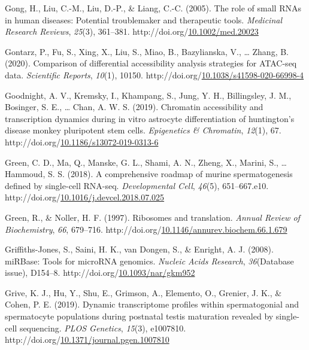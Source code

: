 \documentclass[12pt,twoside]{reedthesis}
\newlength{\cslhangindent}
\newenvironment{CSLReferences}[2] %
 {%
  \setlength{\parindent}{0pt}
  \ifodd #1 \everypar{\setlength{\hangindent}{\cslhangindent}}\ignorespaces\fi
  \ifnum #2 > 0
  \setlength{\parskip}{#2\baselineskip}
  \fi
 }%
 {}
\begin{document}
\begin{CSLReferences}{1}{0}
\leavevmode{}%
Gong, H., Liu, C.-M., Liu, D.-P., \& Liang, C.-C. (2005). The role of small RNAs in human diseases: Potential troublemaker and therapeutic tools. \emph{Medicinal Research Reviews}, \emph{25}(3), 361--381. http://doi.org/\href{https://doi.org/10.1002/med.20023}{10.1002/med.20023}

\leavevmode{}%
Gontarz, P., Fu, S., Xing, X., Liu, S., Miao, B., Bazylianska, V., \ldots{} Zhang, B. (2020). Comparison of differential accessibility analysis strategies for ATAC-seq data. \emph{Scientific Reports}, \emph{10}(1), 10150. http://doi.org/\href{https://doi.org/10.1038/s41598-020-66998-4}{10.1038/s41598-020-66998-4}

\leavevmode{}%
Goodnight, A. V., Kremsky, I., Khampang, S., Jung, Y. H., Billingsley, J. M., Bosinger, S. E., \ldots{} Chan, A. W. S. (2019). Chromatin accessibility and transcription dynamics during in vitro astrocyte differentiation of huntington's disease monkey pluripotent stem cells. \emph{Epigenetics \& Chromatin}, \emph{12}(1), 67. http://doi.org/\href{https://doi.org/10.1186/s13072-019-0313-6}{10.1186/s13072-019-0313-6}

\leavevmode{}%
Green, C. D., Ma, Q., Manske, G. L., Shami, A. N., Zheng, X., Marini, S., \ldots{} Hammoud, S. S. (2018). A comprehensive roadmap of murine spermatogenesis defined by single-cell RNA-seq. \emph{Developmental Cell}, \emph{46}(5), 651--667.e10. http://doi.org/\href{https://doi.org/10.1016/j.devcel.2018.07.025}{10.1016/j.devcel.2018.07.025}

\leavevmode{}%
Green, R., \& Noller, H. F. (1997). Ribosomes and translation. \emph{Annual Review of Biochemistry}, \emph{66}, 679--716. http://doi.org/\href{https://doi.org/10.1146/annurev.biochem.66.1.679}{10.1146/annurev.biochem.66.1.679}

\leavevmode{}%
Griffiths-Jones, S., Saini, H. K., van Dongen, S., \& Enright, A. J. (2008). miRBase: Tools for microRNA genomics. \emph{Nucleic Acids Research}, \emph{36}(Database issue), D154--8. http://doi.org/\href{https://doi.org/10.1093/nar/gkm952}{10.1093/nar/gkm952}

\leavevmode{}%
Grive, K. J., Hu, Y., Shu, E., Grimson, A., Elemento, O., Grenier, J. K., \& Cohen, P. E. (2019). Dynamic transcriptome profiles within spermatogonial and spermatocyte populations during postnatal testis maturation revealed by single-cell sequencing. \emph{PLOS Genetics}, \emph{15}(3), e1007810. http://doi.org/\href{https://doi.org/10.1371/journal.pgen.1007810}{10.1371/journal.pgen.1007810}


\end{CSLReferences}
\end{document}
